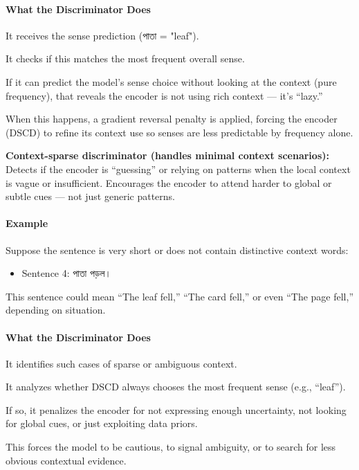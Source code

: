 \documentclass[a4paper,12pt]{article}
\begin{document}
\paragraph{What the Discriminator Does}

It receives the sense prediction (\textbengali{পাতা} = "leaf").

It checks if this matches the most frequent overall sense.

If it can predict the model’s sense choice without looking at the context (pure frequency), that reveals the encoder is not using rich context — it’s “lazy.”

When this happens, a gradient reversal penalty is applied, forcing the encoder (DSCD) to refine its context use so senses are less predictable by frequency alone.

\bigskip

\textbf{Context-sparse discriminator (handles minimal context scenarios):} Detects if the encoder is “guessing” or relying on patterns when the local context is vague or insufficient. Encourages the encoder to attend harder to global or subtle cues — not just generic patterns.

\paragraph{Example}

Suppose the sentence is very short or does not contain distinctive context words:

\begin{itemize}
    \item Sentence 4: \textbengali{পাতা পড়ল।}
\end{itemize}

This sentence could mean “The leaf fell,” “The card fell,” or even “The page fell,” depending on situation.

\paragraph{What the Discriminator Does}

It identifies such cases of sparse or ambiguous context.

It analyzes whether DSCD always chooses the most frequent sense (e.g., “leaf”).

If so, it penalizes the encoder for not expressing enough uncertainty, not looking for global cues, or just exploiting data priors.

This forces the model to be cautious, to signal ambiguity, or to search for less obvious contextual evidence.
\end{document}
